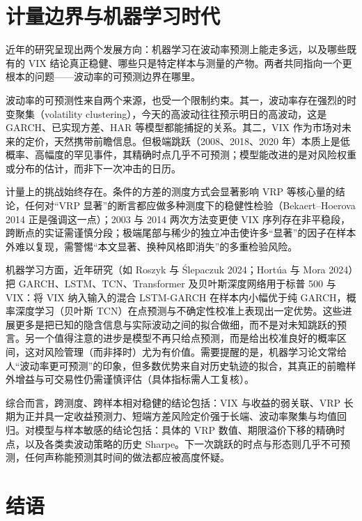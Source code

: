 \documentclass[11pt,a4paper]{ctexart}
\begin{document}
\section{计量边界与机器学习时代}

近年的研究呈现出两个发展方向：机器学习在波动率预测上能走多远，以及哪些既有的 VIX 结论真正稳健、哪些只是特定样本与测量的产物。两者共同指向一个更根本的问题——波动率的可预测边界在哪里。

波动率的可预测性来自两个来源，也受一个限制约束。其一，波动率存在强烈的时变聚集（volatility clustering），今天的高波动往往预示明日的高波动，这是 GARCH、已实现方差、HAR 等模型都能捕捉的关系。其二，VIX 作为市场对未来的定价，天然携带前瞻信息。但极端跳跃（2008、2018、2020 年）本质上是低概率、高幅度的罕见事件，其精确时点几乎不可预测；模型能改进的是对风险权重或分布的估计，而非下一次冲击的日历。

计量上的挑战始终存在。条件的方差的测度方式会显著影响 VRP 等核心量的结论，任何对“VRP 显著”的断言都应做多种测度下的稳健性检验（Bekaert–Hoerova 2014 正是强调这一点）；2003 与 2014 两次方法变更使 VIX 序列存在非平稳段，跨断点的实证需谨慎分段；极端尾部与稀少的独立冲击使许多“显著”的因子在样本外难以复现，需警惕“本文显著、换种风格即消失”的多重检验风险。

机器学习方面，近年研究（如 Roszyk 与 Ślepaczuk 2024；Hortúa 与 Mora 2024）把 GARCH、LSTM、TCN、Transformer 及贝叶斯深度网络用于标普 500 与 VIX：将 VIX 纳入输入的混合 LSTM-GARCH 在样本内小幅优于纯 GARCH，概率深度学习（贝叶斯 TCN）在点预测与不确定性校准上表现出一定优势。这些进展更多是把已知的隐含信息与实际波动之间的拟合做细，而不是对未知跳跃的预言。另一个值得注意的进步是模型不再只给点预测，而是给出校准良好的概率区间，这对风险管理（而非择时）尤为有价值。需要提醒的是，机器学习论文常给人“波动率更可预测”的印象，但多数优势来自对历史轨迹的拟合，其真正的前瞻样外增益与可交易性仍需谨慎评估（具体指标需人工复核）。

综合而言，跨测度、跨样本相对稳健的结论包括：VIX 与收益的弱关联、VRP 长期为正并具一定收益预测力、短端方差风险定价强于长端、波动率聚集与均值回归。对模型与样本敏感的结论包括：具体的 VRP 数值、期限溢价下移的精确时点，以及各类卖波动策略的历史 Sharpe。下一次跳跃的时点与形态则几乎不可预测，任何声称能预测其时间的做法都应被高度怀疑。

\section*{结语}
\end{document}
